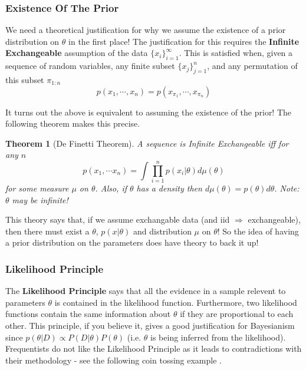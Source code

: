 \documentclass[]{article}
\theoremstyle{mattstyle}
\newtheorem{theorem}{Theorem}[section]
\theoremstyle{definition}
\begin{document}
\subsubsection{Existence Of The Prior}
We need a theoretical justification for why we assume the existence of a prior distribution on \(\theta\) in the first place! The justification for this requires the \textbf{Infinite Exchangeable} assumption of the data \(\{x_i\}_{i=1}^{\infty}\). This is satisfied when, given a sequence of random variables, any finite subset \(\{x_j\}_{j=1}^{n}\), and any permutation of this subset \(\pi_{1:n}\) 
\begin{equation}
p(x_1, \cdots, x_n) = p(x_{\pi_1}, \cdots, x_{\pi_n})
\end{equation}

It turns out the above is equivalent to assuming the existence of the prior! The following theorem makes this precise.

\begin{theorem}[De Finetti Theorem]
	A sequence is Infinite Exchangeable iff for any \(n\)
	$$ p(x_1, \cdots x_n) = \int\prod_{i=1}^n p(x_i|\theta)d\mu(\theta) $$
	for some measure \(\mu\) on \(\theta\). Also, if $\theta$ has a density then $d\mu(\theta) = p(\theta)d\theta$. Note: \(\theta\) may be infinite!
\end{theorem}

This theory says that, if we assume exchangable data (and iid $\Rightarrow$ exchangeable), then there must exist a \(\theta\), \(p(x|\theta)\) and distribution \(\mu\) on \(\theta\)! So the idea of having a prior distribution on the parameters does have theory to back it up!

\subsubsection{Likelihood Principle}

The \textbf{Likelihood Principle} says that all the evidence in a sample relevent to parameters \(\theta\) is contained in the likelihood function. Furthermore, two likelihood functions contain the same information about \(\theta\) if they
are proportional to each other\cite{slides}. This principle, if you believe it, gives a good justification for Bayesianism since \(p(\theta|D) \propto P(D|\theta)P(\theta)\) (i.e. $\theta$ is being inferred from the likelihood). Frequentists do not like the Likelihood Principle as it leads to contradictions with their methodology - see the following coin tossing example \cite{MJordanNotes}.
\end{document}
